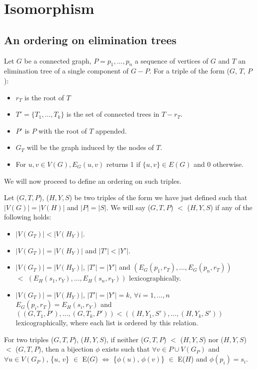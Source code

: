 \section{Isomorphism}\subsection{An ordering on elimination trees}
\begin{definition}
Let $G$ be a connected graph, $P = p_1,\ldots, p_n$ a sequence of vertices of $G$ and $T$ an elimination tree of a single component of $G-P$. For a triple of the form ($G$, $T$, $P$):
  
\begin{itemize}
 \item $r_T$ is the root of $T$
 \item $T' = \{T_1, \ldots, T_k\}$ is the set of connected trees in $T-r_T$.
 \item $P'$ is $P$ with the root of $T$ appended.
 \item $G_T$ will be the graph induced by the nodes of $T$.
 \item For $u,v \in V(G), E_G(u, v)$ returns 1 if $\{u, v\} \in E(G)$ and 0 otherwise.
 \end{itemize}
We will now proceed to define an ordering on such triples.
\end{definition}
 
\begin{definition}
Let ($G, T, P$), ($H, Y, S$) be two triples of the form we have just defined such that $|V(G)| = |V(H)|$ and $|P| = |S|$. We will say ($G, T, P$) $<$ ($H, Y, S$) if any of the following holds:
 
\begin{itemize}
\item $|V(G_T)| < |V(H_Y)|$.
\item $|V(G_T)| = |V(H_Y)|$ and $|T'| < |Y'|$.
\item $|V(G_T)| = |V(H_Y)|$, $|T'| = |Y'|$ and $(E_G(p_1, r_T), \ldots, E_G(p_n, r_T))$ \\ $ < $ $(E_H(s_1, r_Y), \ldots, E_H(s_n, r_Y))$ lexicographically.
\item $|V(G_T)| = |V(H_Y)|$, $|T'| = |Y'| = k$, $\forall i = 1, \ldots, n$ $E_G(p_i, r_T) = E_H(s_i, r_Y)$  and $((G, T_1, P'), \ldots, (G, T_k, P')) < ((H, Y_1, S'), \ldots, (H, Y_k, S'))$ lexicographically, where each list is ordered by this relation.
\end{itemize}
\end{definition}
\begin{lemma}
\label{lemma:et comparison}
For two triples ($G, T, P$), ($H, Y, S$), if neither ($G, T, P$) $<$ ($H, Y, S$) nor ($H, Y, S$) $<$ ($G, T, P$), then a  bijection $\phi$ exists such that $\forall v \in P \cup V(G_P)$ and $\forall u \in V(G_P)$, \{$u$, $v$\} $\in$ E($G$) $\iff$ \{$\phi(u)$, $\phi(v)$\} $\in$ E($H$) and $\phi(p_i) = s_i$.
\end{lemma}
 
